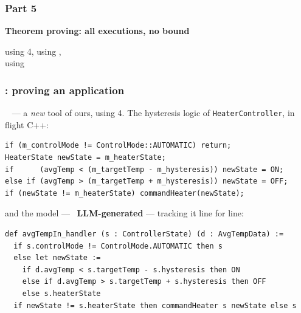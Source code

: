 \begin{frame}
  \frametitle{Part 5}

\icontp[3.2]

\vspace{0.45cm}

{\Large\bf Theorem proving: all executions, no bound}

\vspace{0.4cm}

{\small \ours{\fcheck{}} using \lean{} 4, \ours{\tasksat{}} using \zthree{},\\[0.2cm]
\ours{\esbmcpy{}} using \esbmc{}}

\end{frame}

\begin{frame}[fragile]
  \frametitle{\fcheck{}: proving an \fprime{} application} \small

\newtag{} \ {\bf \fcheck{}} --- a {\em new} tool of ours, using \lean{} 4. The
hysteresis logic of {\tt HeaterController}, in flight C++:

\begin{lstlisting}[style=cpp]
if (m_controlMode != ControlMode::AUTOMATIC) return;
HeaterState newState = m_heaterState;
if      (avgTemp < (m_targetTemp - m_hysteresis)) newState = ON;
else if (avgTemp > (m_targetTemp + m_hysteresis)) newState = OFF;
if (newState != m_heaterState) commandHeater(newState);
\end{lstlisting}

\vspace{-0.15cm}

and the \lean{} model --- \iconllm[0.85]\ {\bf LLM-generated} --- tracking it line
for line:

\begin{lstlisting}[language=lean4]
def avgTempIn_handler (s : ControllerState) (d : AvgTempData) :=
  if s.controlMode != ControlMode.AUTOMATIC then s
  else let newState :=
    if d.avgTemp < s.targetTemp - s.hysteresis then ON
    else if d.avgTemp > s.targetTemp + s.hysteresis then OFF
    else s.heaterState
  if newState != s.heaterState then commandHeater s newState else s
\end{lstlisting}

\end{frame}

